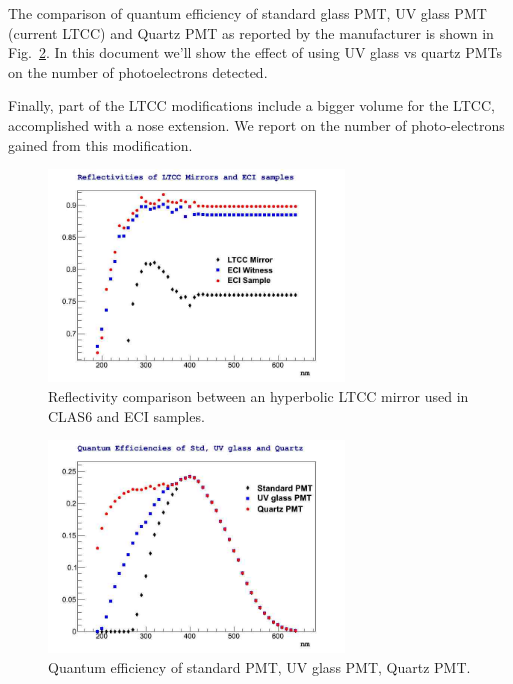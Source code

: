 \documentclass{article}
\begin{document}
The comparison of quantum efficiency of standard glass PMT, UV glass PMT (current LTCC) and Quartz PMT
as reported by the manufacturer \cite{bib:alex}
is shown in Fig.~\ref{fig:qe}.  In this document we'll show the effect of using UV glass vs quartz PMTs 
on the number of photoelectrons detected.

Finally, part of the LTCC modifications include a bigger volume for the LTCC, accomplished with a nose extension.
We report on the number of photo-electrons gained from this modification.

\newpage


\begin{figure}[t]
	\centering
	\includegraphics[width=0.7\textwidth]{img/reflectivity.jpg}
	\caption{\scriptsize Reflectivity comparison between an hyperbolic LTCC mirror used in CLAS6 and ECI samples.}
	\label{fig:refl}
\end{figure}
\begin{figure}[b]
	\centering
	\includegraphics[width=0.7\textwidth]{img/quantum_efficiency.jpg}
	\caption{\scriptsize Quantum efficiency of standard PMT, UV glass PMT, Quartz PMT.}
	\label{fig:qe}
\end{figure}
\end{document}
